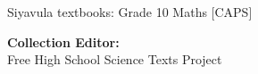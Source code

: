 \begin{center}
    \thispagestyle{empty}

    \vspace*{2in}

    {
    {\Huge Siyavula textbooks: Grade 10 Maths [CAPS]}
    \vspace*{1in}
    \\

    
        {\Large \textbf{Collection Editor:}\vspace{1mm}\\
        
          \indent 
	  Free High School Science Texts Project
	\\
        
        \vspace{3mm}
      

    \vfill

    }}
    \end{center}

    
    \newpage
    \thispagestyle{empty}
  

